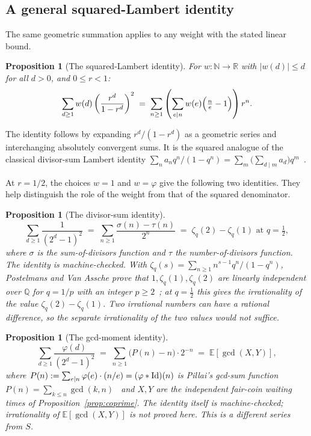 \documentclass[11pt]{article}
\theoremstyle{plain}
\newtheorem{prop}[thm]{Proposition}
\theoremstyle{definition}
\theoremstyle{remark}
\let\origmathrm\mathrm
\renewcommand{\mathrm}[1]{\ifmmode\origmathrm{#1}\else\textrm{#1}\fi}%
\begin{document}
\subsection{A general squared-Lambert identity}
\label{ssec:lambert}

The same geometric summation applies to any weight with the stated
linear bound.

\begin{prop}[The squared-Lambert identity]
\label{prop:lambertengine}
For $w:\mathbb{N}\to\mathbb{R}$ with $|w(d)|\le d$ for all $d>0$, and $0\le r<1$:
\[
\sum_{d\ge1} w(d)\left(\frac{r^d}{1-r^d}\right)^2 \;=\; \sum_{n\ge1}\left(\sum_{e\mid n} w(e)\Bigl(\tfrac{n}{e}-1\Bigr)\right) r^n.
\]
\end{prop}

\noindent The identity follows by expanding $r^d/(1-r^d)$ as a geometric
series and interchanging absolutely convergent sums.  It is the squared
analogue of the classical divisor-sum Lambert identity
$\sum_na_nq^n/(1-q^n)=\sum_m\bigl(\sum_{d\mid m}a_d\bigr)q^m$~\cite[(1),
p.~2]{merca-schmidt}.

At $r=1/2$, the choices $w=1$ and $w=\varphi$ give the following two
identities. They help distinguish the role of the weight from that of the
squared denominator.

\begin{prop}[The divisor-sum identity]
\label{prop:zetaq}
\[
\sum_{d\ge1} \frac{1}{(2^d-1)^2} \;=\; \sum_{n\ge1} \frac{\sigma(n)-\tau(n)}{2^n} \;=\; \zeta_q(2)-\zeta_q(1) \text{ at } q=\tfrac12,
\]
where $\sigma$ is the sum-of-divisors function and $\tau$ the number-of-divisors
function. The \emph{identity} is machine-checked.  With
$\zeta_q(s)=\sum_{n\ge1}n^{s-1}q^n/(1-q^n)$, Postelmans and Van Assche prove
that $1,\zeta_q(1),\zeta_q(2)$ are linearly independent over $\mathbb{Q}$ for
$q=1/p$ with an integer $p\ge2$~\cite[Theorem~1.3, p.~3]{postelmans-vanassche};
at $q=\tfrac12$ this gives the irrationality of the \emph{value}
$\zeta_q(2)-\zeta_q(1)$.
Two irrational numbers can have a rational difference, so the separate
irrationality of the two values would not suffice.
\end{prop}

\begin{prop}[The gcd-moment identity]
\label{prop:pillai}
\[
\sum_{d\ge1} \frac{\varphi(d)}{(2^d-1)^2} \;=\; \sum_{n\ge1} \bigl(P(n)-n\bigr)\cdot 2^{-n} \;=\; \mathbb{E}[\gcd(X,Y)],
\]
where $P(n) := \sum_{e\mid n}\varphi(e)\cdot(n/e) = (\varphi * \mathrm{Id})(n)$
is Pillai's gcd-sum function $P(n)=\sum_{k\le n}\gcd(k,n)$~\cite[\S1,
(1)--(2)]{toth-gcd} and $X,Y$ are the independent fair-coin waiting
times of Proposition~\ref{prop:coprime}. The identity itself is
machine-checked; irrationality of $\mathbb{E}[\gcd(X,Y)]$ is not proved here. This is a
different series from $S$.
\end{prop}
\end{document}
